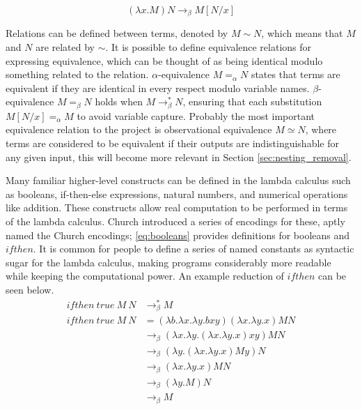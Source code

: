\documentclass[12pt,a4paper]{report}
\theoremstyle{definition}
\theoremstyle{remark}
\begin{document}
\begin{equation}\label{eq:beta_reduction}
   (\lambda x.M)N \rightarrow_{\beta} M[N/x]
\end{equation}

Relations can be defined between terms, denoted by $M \sim N$, which means that $M$ and $N$ are related by $\sim$. It is possible to define equivalence relations for expressing equivalence, which can be thought of as being identical modulo something related to the relation. $\alpha$-equivalence $M =_{\alpha} N$ states that terms are equivalent if they are identical in every respect modulo variable names. $\beta$-equivalence $M =_{\beta} N$ holds when $M \rightarrow_{\beta}^* N$, ensuring that each substitution $M[N/x] =_{\alpha} M$ to avoid variable capture. Probably the most important equivalence relation to the project is observational equivalence $M \simeq N$, where terms are considered to be equivalent if their outputs are indistinguishable for any given input, this will become more relevant in Section \ref{sec:nesting_removal}.

Many familiar higher-level constructs can be defined in the lambda calculus such as booleans, if-then-else expressions, natural numbers, and numerical operations like addition. These constructs allow real computation to be performed in terms of the lambda calculus. Church introduced a series of encodings for these, aptly named the Church encodings; \eqref{eq:booleans} provides definitions for booleans and $ifthen$. It is common for people to define a series of named constants as syntactic sugar for the lambda calculus, making programs considerably more readable while keeping the computational power. An example reduction of $ifthen$ can be seen below.
\begin{equation*}
\begin{split}
ifthen\ true\ M\ N &\rightarrow_{\beta}^* M\\
ifthen\ true\ M\ N &= (\lambda b. \lambda x.\lambda y.bxy)(\lambda x.\lambda y.x) M N\\
& \rightarrow_{\beta} (\lambda x. \lambda y.(\lambda x.\lambda y.x) x y) M N\\
& \rightarrow_{\beta} (\lambda y.(\lambda x.\lambda y.x) M y) N\\
& \rightarrow_{\beta} (\lambda x.\lambda y.x) M N\\
& \rightarrow_{\beta} (\lambda y.M) N\\
& \rightarrow_{\beta} M
\end{split}
\end{equation*}
\end{document}
